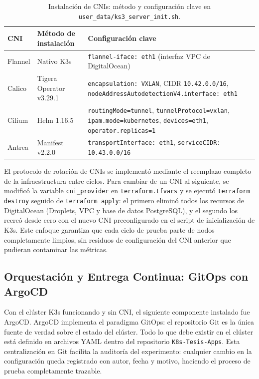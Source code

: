 \begin{table}[htbp]
\centering
\scriptsize
\renewcommand{\arraystretch}{1.25}
\setlength{\tabcolsep}{4pt}
\caption{Instalación de CNIs: método y configuración clave en \texttt{user\_data/ks3\_server\_init.sh}.}
\label{tab:cni-instalacion}
\begin{tabularx}{\textwidth}{|l|p{3.2cm}|Y|}
\hline
\textbf{CNI} & \textbf{Método de instalación} & \textbf{Configuración clave} \\
\hline
Flannel & Nativo K3s & \texttt{flannel-iface: eth1} (interfaz VPC de DigitalOcean) \\
\hline
Calico & Tigera Operator v3.29.1 & \texttt{encapsulation: VXLAN}, CIDR \texttt{10.42.0.0/16}, \texttt{nodeAddressAutodetectionV4.interface: eth1} \\
\hline
Cilium & Helm 1.16.5 & \texttt{routingMode=tunnel}, \texttt{tunnelProtocol=vxlan}, \texttt{ipam.mode=kubernetes}, \texttt{devices=eth1}, \texttt{operator.replicas=1} \\
\hline
Antrea & Manifest v2.2.0 & \texttt{transportInterface: eth1}, \texttt{serviceCIDR: 10.43.0.0/16} \\
\hline
\end{tabularx}
\end{table}

El protocolo de rotación de CNIs se implementó mediante el reemplazo completo de la infraestructura entre ciclos. Para cambiar de un CNI al siguiente, se modificó la variable \texttt{cni\_provider} en \texttt{terraform.tfvars} y se ejecutó \texttt{terraform destroy} seguido de \texttt{terraform apply}: el primero eliminó todos los recursos de DigitalOcean (Droplets, VPC y base de datos PostgreSQL), y el segundo los recreó desde cero con el nuevo CNI preconfigurado en el script de inicialización de K3s. Este enfoque garantiza que cada ciclo de prueba parte de nodos completamente limpios, sin residuos de configuración del CNI anterior que pudieran contaminar las métricas.

\subsection{Orquestación y Entrega Continua: GitOps con ArgoCD}

Con el clúster K3s funcionando y sin CNI, el siguiente componente instalado fue ArgoCD. ArgoCD implementa el paradigma GitOps: el repositorio Git es la única fuente de verdad sobre el estado del clúster. Todo lo que debe existir en el clúster está definido en archivos YAML dentro del repositorio \texttt{K8s-Tesis-Apps}. Esta centralización en Git facilita la auditoría del experimento: cualquier cambio en la configuración queda registrado con autor, fecha y motivo, haciendo el proceso de prueba completamente trazable.

